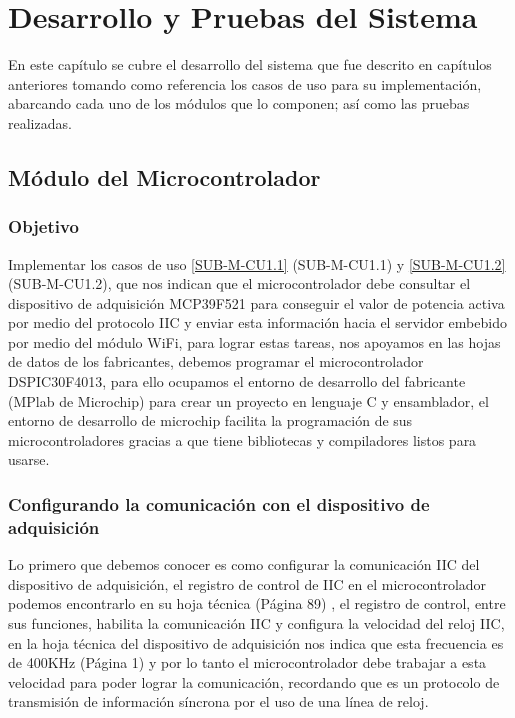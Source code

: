 \chapter{Desarrollo y Pruebas del Sistema}\label{chapter5}
En este capítulo se cubre el desarrollo del sistema que fue descrito en capítulos anteriores tomando como referencia los casos de uso para su implementación, abarcando cada uno de los módulos que lo componen; así como las pruebas realizadas.

\section{Módulo del Microcontrolador}

\subsection{Objetivo}
Implementar los casos de uso \ref{SUB-M-CU1.1} (SUB-M-CU1.1) y \ref{SUB-M-CU1.2} (SUB-M-CU1.2), que nos indican que el microcontrolador debe consultar el dispositivo de adquisición MCP39F521 para conseguir el valor de potencia activa por medio del protocolo IIC y enviar esta información hacia el servidor embebido por medio del módulo WiFi, para lograr estas tareas, nos apoyamos en las hojas de datos de los fabricantes, debemos programar el microcontrolador DSPIC30F4013, para ello ocupamos el entorno de desarrollo del fabricante (MPlab de Microchip) para crear un proyecto en lenguaje C y ensamblador, el entorno de desarrollo de microchip facilita la programación de sus microcontroladores gracias a que tiene bibliotecas y compiladores listos para usarse.

\subsection{Configurando la comunicación con el dispositivo de adquisición}
Lo primero que debemos conocer es como configurar la comunicación IIC del dispositivo de adquisición, el registro de control de IIC en el microcontrolador podemos encontrarlo en su hoja técnica (Página 89) \citep{DatasheetDSPIC30F4013}, el registro de control, entre sus funciones, habilita la comunicación IIC y configura la velocidad del reloj IIC, en la hoja técnica del dispositivo de adquisición nos indica que esta frecuencia es de 400KHz (Página 1) \citep{DatasheetDSPIC30F4013} y por lo tanto el microcontrolador debe trabajar a esta velocidad para poder lograr la comunicación, recordando que es un protocolo de transmisión de información síncrona por el uso de una línea de reloj.


